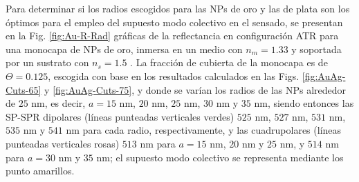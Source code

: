Para determinar si los radios escogidos para las NPs de oro y las de plata son los óptimos para el empleo del supuesto modo colectivo en el sensado, se presentan en la Fig. \ref{fig:Au-R-Rad}	gráficas de la reflectancia en configuración ATR para una monocapa de NPs de oro, inmersa en un medio con $n_m=1.33$ y soportada por un sustrato con $n_s=1.5$ . La fracción de cubierta de la monocapa es de $\Theta=0.125$, escogida con base en los resultados calculados en las Figs. \ref{fig:AuAg-Cuts-65} y \ref{fig:AuAg-Cuts-75}, y donde se varían los radios de las NPs alrededor de $25$ nm, es decir, $a=15$ nm, $20$ nm, $25$ nm, $30$ nm y $35$ nm, siendo entonces las SP-SPR dipolares (líneas punteadas verticales verdes) $525$ nm, $527$ nm, $531$ nm, $535$ nm y $541$ nm para cada radio, respectivamente, y las cuadrupolares (líneas punteadas verticales rosas) $513$ nm para $a=15$ nm, $20$ nm y $25$ nm, y $514$ nm para $a=30$ nm y $35$ nm; el supuesto modo colectivo se representa mediante los punto amarillos.

